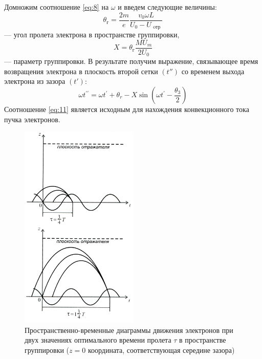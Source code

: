 Домножим соотношение \eqref{eq:8} на $\omega$ и введем следующие величины:
\begin{equation}
	\theta _ { \text{г} } = \frac { 2 m } { e } \frac { v _ { 0 } \omega L } { U _ { 0 } - U _ { \text{ oтр } } }
	\label{eq:9}
\end{equation} — угол пролета электрона в пространстве группировки,
\begin{equation}
	X = \theta _ { \text{г} } \frac{M U _ { m } } { 2 U _ { 0 } }
	\label{eq:10}
\end{equation} — параметр группировки. В результате получим выражение, связывающее время возвращения электрона в плоскость второй сетки $(t'' )$ со временем выхода электрона из зазора $(t')$:
\begin{equation}
	\omega t ^ { \prime \prime } = \omega t ^ { \prime } + \theta _ { r } - X \sin \left( \omega t ^ { \prime } - \frac { \theta _ { 3 } } { 2 } \right)
	\label{eq:11}
\end{equation}
Соотношение \eqref{eq:11} является исходным для нахождения конвекционного тока пучка электронов.

\begin{figure}[h!]
	\centering
	\includegraphics[width=0.5\textwidth]{text/fig3}
	\caption{Пространственно-временные диаграммы движения электронов при двух значениях оптимального времени пролета $\tau$ в пространстве группировки ($z=0$ координата, соответствующая середине зазора)}
	\label{fig:3}
\end{figure}

